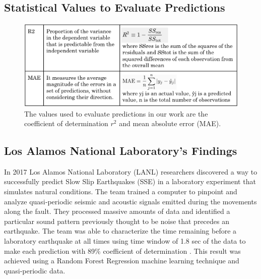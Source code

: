 \documentclass[]{llncs} %
\begin{document}
\subsection{Statistical Values to Evaluate Predictions}
\begin{figure}
	\centering
	\includegraphics[width=.9\linewidth]{background}
	\caption{The values used to evaluate predictions in our work are the coefficient of determination $r^2$ and mean absolute error (MAE).}
	\label{fig:background}
\end{figure}

\subsection{Los Alamos National Laboratory's Findings}
In 2017 Los Alamos National Laboratory (LANL) researchers discovered a way to successfully predict Slow Slip Earthquakes (SSE) in a laboratory experiment that simulates natural conditions. The team trained a computer to pinpoint and analyze quasi‐periodic seismic and acoustic signals emitted during the movements along the fault. They processed massive amounts of data and identified a particular sound pattern previously thought to be noise that precedes an earthquake. The team was able to characterize the time remaining before a laboratory earthquake at all times using time window of 1.8 sec of the data to make each prediction with 89\% coefficient of determination \cite{LANLNews}. This result was achieved using a Random Forest Regression machine learning technique and quasi‐periodic data. \par
\end{document}
